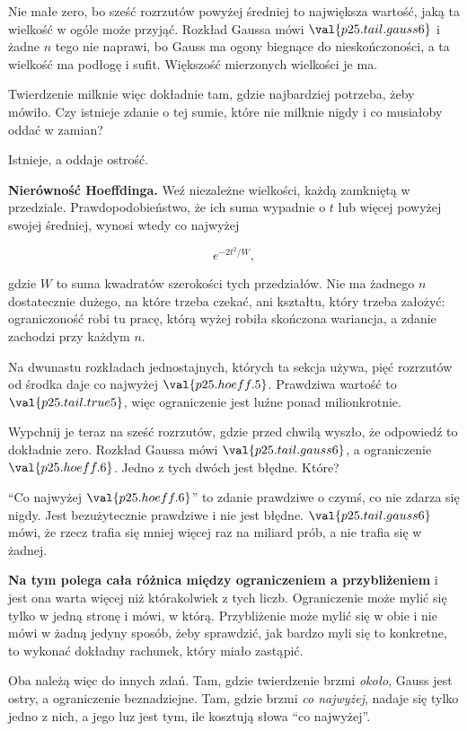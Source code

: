 \begin{fr}

Nie małe \dash{} zero, bo sześć rozrzutów powyżej średniej to największa
wartość, jaką ta wielkość w ogóle może przyjąć. Rozkład Gaussa mówi
$\val{p25.tail.gauss6}$ i żadne $n$ tego nie naprawi, bo Gauss ma ogony
biegnące do nieskończoności, a ta wielkość ma podłogę i sufit. Większość
mierzonych wielkości je ma.

Twierdzenie milknie więc dokładnie tam, gdzie najbardziej potrzeba, żeby
mówiło. Czy istnieje zdanie o tej sumie, które nie milknie nigdy \dash{} i co
musiałoby oddać w zamian?
\dotline
\nextframe
\end{fr}

\begin{fr}
\begin{ansblock}
Istnieje, a oddaje ostrość.
\end{ansblock}

\textbf{Nierówność Hoeffdinga.} Weź niezależne wielkości, każdą zamkniętą w
przedziale. Prawdopodobieństwo, że ich suma wypadnie o $t$ lub więcej powyżej
swojej średniej, wynosi wtedy co najwyżej

\[ e^{-2t^{2}/W}, \]

gdzie $W$ to suma kwadratów szerokości tych przedziałów. Nie ma żadnego $n$
dostatecznie dużego, na które trzeba czekać, ani kształtu, który trzeba
założyć: ograniczoność robi tu pracę, którą wyżej robiła skończona wariancja,
a zdanie zachodzi przy każdym $n$.

Na dwunastu rozkładach jednostajnych, których ta sekcja używa, pięć rozrzutów
od środka daje co najwyżej $\val{p25.hoeff.5}$. Prawdziwa wartość to
$\val{p25.tail.true5}$, więc ograniczenie jest luźne ponad milionkrotnie.

Wypchnij je teraz na sześć rozrzutów, gdzie przed chwilą wyszło, że odpowiedź
to dokładnie zero. Rozkład Gaussa mówi $\val{p25.tail.gauss6}$, a ograniczenie
$\val{p25.hoeff.6}$. Jedno z tych dwóch jest błędne. Które?
\dotline
\nextframe
\end{fr}

\begin{fr}

\enquote{Co najwyżej $\val{p25.hoeff.6}$} to zdanie prawdziwe o czymś, co nie
zdarza się nigdy. Jest bezużytecznie prawdziwe i nie jest błędne.
$\val{p25.tail.gauss6}$ mówi, że rzecz trafia się mniej więcej raz na miliard
prób, a nie trafia się w żadnej.

\textbf{Na tym polega cała różnica między ograniczeniem a przybliżeniem} i
jest ona warta więcej niż którakolwiek z tych liczb. Ograniczenie może mylić
się tylko w jedną stronę i mówi, w którą. Przybliżenie może mylić się w obie i
nie mówi w żadną \dash{} jedyny sposób, żeby sprawdzić, jak bardzo myli się to
konkretne, to wykonać dokładny rachunek, który miało zastąpić.

Oba należą więc do innych zdań. Tam, gdzie twierdzenie brzmi \emph{około},
Gauss jest ostry, a ograniczenie beznadziejne. Tam, gdzie brzmi \emph{co
najwyżej}, nadaje się tylko jedno z nich, a jego luz jest tym, ile kosztują
słowa \enquote{co najwyżej}.
\end{fr}

